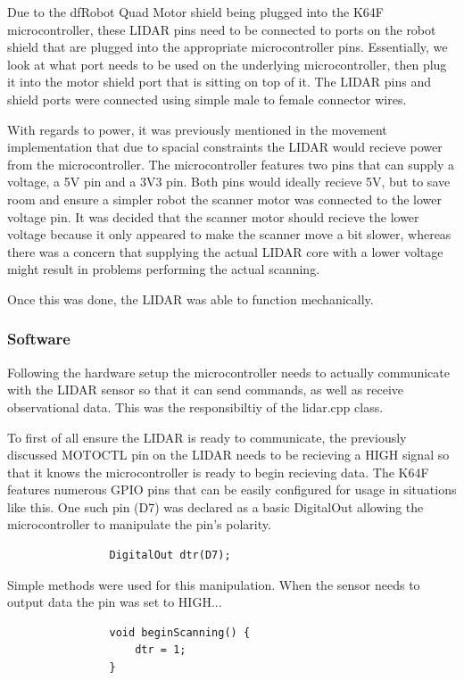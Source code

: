 				Due to the dfRobot Quad Motor shield being plugged into the K64F microcontroller, these LIDAR pins need to be connected to ports on the robot shield that are plugged into the appropriate microcontroller pins. Essentially, we look at what port needs to be used on the underlying microcontroller, then plug it into the motor shield port that is sitting on top of it. The LIDAR pins and shield ports were connected using simple male to female connector wires.
				
				With regards to power, it was previously mentioned in the movement implementation that due to spacial constraints the LIDAR would recieve power from the microcontroller. The microcontroller features two pins that can supply a voltage, a 5V pin and a 3V3 pin. Both pins would ideally recieve 5V, but to save room and ensure a simpler robot the scanner motor was connected to the lower voltage pin. It was decided that the scanner motor should recieve the lower voltage because it only appeared to make the scanner move a bit slower, whereas there was a concern that supplying the actual LIDAR core with a lower voltage might result in problems performing the actual scanning. 
				
				Once this was done, the LIDAR was able to function mechanically.
				
				\subsubsection{Software}
				Following the hardware setup the microcontroller needs to actually communicate with the LIDAR sensor so that it can send commands, as well as receive observational data. This was the responsibiltiy of the lidar.cpp class.
				
				To first of all ensure the LIDAR is ready to communicate, the previously discussed MOTOCTL pin on the LIDAR needs to be recieving a HIGH signal so that it knows the microcontroller is ready to begin recieving data. The K64F features numerous GPIO pins that can be easily configured for usage in situations like this. One such pin (D7) was declared as a basic DigitalOut allowing the microcontroller to manipulate the pin's polarity.
				
				\begin{lstlisting}
				DigitalOut dtr(D7);
				\end{lstlisting}
				
				Simple methods were used for this manipulation. When the sensor needs to output data the pin was set to HIGH...
				\begin{lstlisting}
				void beginScanning() {
					dtr = 1;
				}
				\end{lstlisting}
				
